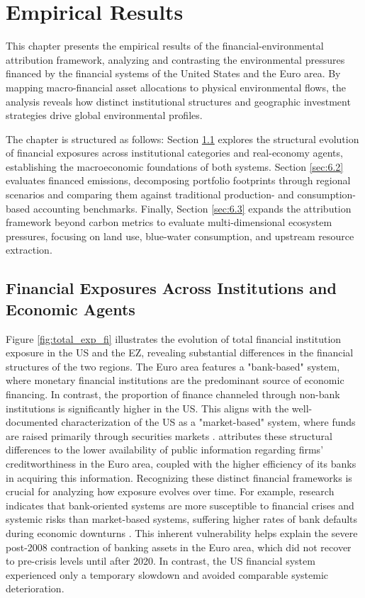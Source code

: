 \chapter{Empirical Results} %
\label{Chapter5} 

This chapter presents the empirical results of the financial-environmental attribution framework, analyzing and contrasting the environmental pressures financed by the financial systems of the United States and the Euro area. By mapping macro-financial asset allocations to physical environmental flows, the analysis reveals how distinct institutional structures and geographic investment strategies drive global environmental profiles. 

The chapter is structured as follows: Section \ref{sec:6.1} explores the structural evolution of financial exposures across institutional categories and real-economy agents, establishing the macroeconomic foundations of both systems. Section \ref{sec:6.2} evaluates financed emissions, decomposing portfolio footprints through regional scenarios and comparing them against traditional production- and consumption-based accounting benchmarks. Finally, Section \ref{sec:6.3} expands the attribution framework beyond carbon metrics to evaluate multi-dimensional ecosystem pressures, focusing on land use, blue-water consumption, and upstream resource extraction.

\section{Financial Exposures Across Institutions and Economic Agents}
\label{sec:6.1}

Figure \ref{fig:total_exp_fi} illustrates the evolution of total financial institution exposure in the US and the EZ, revealing substantial differences in the financial structures of the two regions. The Euro area features a "bank-based" system, where monetary financial institutions are the predominant source of economic financing. In contrast, the proportion of finance channeled through non-bank institutions is significantly higher in the US. This aligns with the well-documented characterization of the US as a "market-based" system, where funds are raised primarily through securities markets \citep{de_fiore_bank_2005, bats_bank-based_2020}. \textcite{de_fiore_bank_2005} attributes these structural differences to the lower availability of public information regarding firms' creditworthiness in the Euro area, coupled with the higher efficiency of its banks in acquiring this information. Recognizing these distinct financial frameworks is crucial for analyzing how exposure evolves over time. For example, research indicates that bank-oriented systems are more susceptible to financial crises and systemic risks than market-based systems, suffering higher rates of bank defaults during economic downturns \citep{gambacorta_financial_2014, bats_bank-based_2020}. This inherent vulnerability helps explain the severe post-2008 contraction of banking assets in the Euro area, which did not recover to pre-crisis levels until after 2020. In contrast, the US financial system experienced only a temporary slowdown and avoided comparable systemic deterioration.

